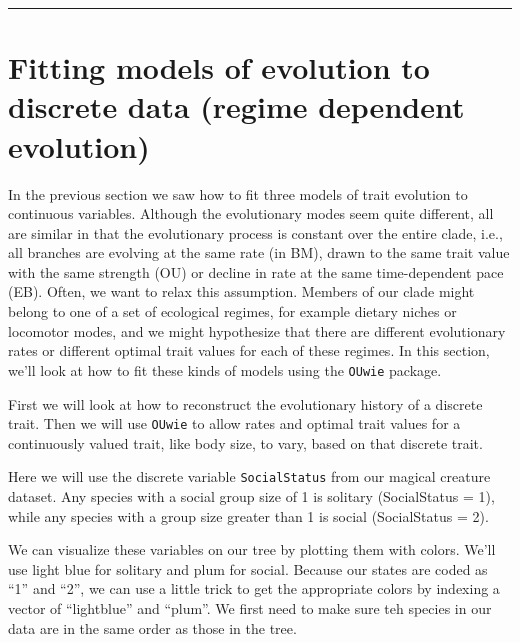 \documentclass[]{book}
\newenvironment{Shaded}{\begin{snugshade}}{\end{snugshade}}
\newcommand{\KeywordTok}[1]{\textcolor[rgb]{0.13,0.29,0.53}{\textbf{{#1}}}}
\newcommand{\StringTok}[1]{\textcolor[rgb]{0.31,0.60,0.02}{{#1}}}
\newcommand{\NormalTok}[1]{{#1}}
\begin{document}
\begin{Shaded}
\end{Shaded}

\begin{center}\rule{0.5\linewidth}{\linethickness}\end{center}

\section{Fitting models of evolution to discrete data (regime dependent
evolution)}\label{fitting-models-of-evolution-to-discrete-data-regime-dependent-evolution}

In the previous section we saw how to fit three models of trait
evolution to continuous variables. Although the evolutionary modes seem
quite different, all are similar in that the evolutionary process is
constant over the entire clade, i.e., all branches are evolving at the
same rate (in BM), drawn to the same trait value with the same strength
(OU) or decline in rate at the same time-dependent pace (EB). Often, we
want to relax this assumption. Members of our clade might belong to one
of a set of ecological regimes, for example dietary niches or locomotor
modes, and we might hypothesize that there are different evolutionary
rates or different optimal trait values for each of these regimes. In
this section, we'll look at how to fit these kinds of models using the
\texttt{OUwie} package.

First we will look at how to reconstruct the evolutionary history of a
discrete trait. Then we will use \texttt{OUwie} to allow rates and
optimal trait values for a continuously valued trait, like body size, to
vary, based on that discrete trait.

Here we will use the discrete variable \texttt{SocialStatus} from our
magical creature dataset. Any species with a social group size of 1 is
solitary (SocialStatus = 1), while any species with a group size greater
than 1 is social (SocialStatus = 2).

We can visualize these variables on our tree by plotting them with
colors. We'll use light blue for solitary and plum for social. Because
our states are coded as ``1'' and ``2'', we can use a little trick to
get the appropriate colors by indexing a vector of ``lightblue'' and
``plum''. We first need to make sure teh species in our data are in the
same order as those in the tree.
\end{document}
